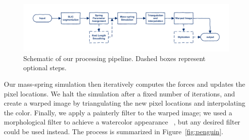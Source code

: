 \begin{figure} \centering
\includegraphics[width=1.0\textwidth]{images/pipeline.pdf}
\caption{Schematic of our processing pipeline. Dashed boxes represent optional steps.}
\label{fig:overview}
\end{figure} 

Our mass-spring simulation then iteratively computes the forces and updates the pixel locations. We halt the simulation after a fixed number of iterations, and create a warped image by triangulating the new pixel locations and interpolating the color. Finally, we apply a painterly filter to the warped image; we used a morphological filter to achieve a watercolor appearance~\cite{Bousseau:2007}
, but any desired filter could be used instead.
The process is summarized in Figure~\ref{fig:penguin}.


